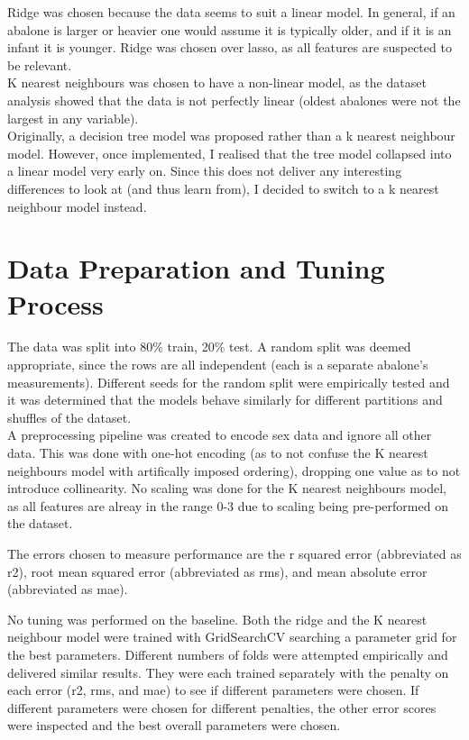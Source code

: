 \documentclass[a4paper, 12pt]{article}
\begin{document}
Ridge was chosen because the data seems to suit a linear model. In general, if an abalone is larger or heavier one would assume it is typically older, and if it is an infant it is younger. Ridge was chosen over lasso, as all features are suspected to be relevant. \\   

K nearest neighbours was chosen to have a non-linear model, as the dataset analysis showed that the data is not perfectly linear (oldest abalones were not the largest in any variable).\\

Originally, a decision tree model was proposed rather than a k nearest neighbour model. However, once implemented, I realised that the tree model collapsed into a linear model very early on. Since this does not deliver any interesting differences to look at (and thus learn from), I decided to switch to a k nearest neighbour model instead.

\section{Data Preparation and Tuning Process}
The data was split into 80\% train, 20\% test. A random split was deemed appropriate, since the rows are all independent (each is a separate abalone's measurements).
Different seeds for the random split were empirically tested and it was determined that the models behave similarly for different partitions and shuffles of the dataset.\\
A preprocessing pipeline was created to encode sex data and ignore all other data. This was done with one-hot encoding (as to not confuse the K nearest neighbours model with artifically imposed ordering), dropping one value as to not introduce collinearity.
No scaling was done for the K nearest neighbours model, as all features are alreay in the range 0-3 due to scaling being pre-performed on the dataset.

The errors chosen to measure performance are the r squared error (abbreviated as r2), root mean squared error (abbreviated as rms), and mean absolute error (abbreviated as mae).

No tuning was performed on the baseline. Both the ridge and the K nearest neighbour model were trained with GridSearchCV searching a parameter grid for the best parameters. Different numbers of folds were attempted empirically and delivered similar results. 
They were each trained separately with the penalty on each error (r2, rms, and mae) to see if different parameters were chosen. 
If different parameters were chosen for different penalties, the other error scores were inspected and the best overall parameters were chosen. 
\end{document}

